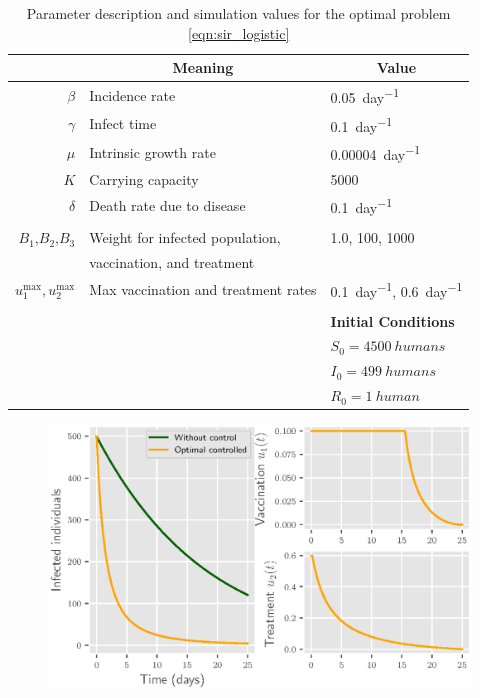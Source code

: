 \begin{table}[htb]
  \begin{center}
    \begin{tabular}{@{}rll@{}} 
      \toprule
      &
      \multicolumn{1}{c}{\textbf{Meaning}}
      & 
      \multicolumn{1}{c}{\textbf{Value}}
      \\
        \midrule
        $\beta$
          & Incidence rate
          & \SI{0.05}{day^{-1}}
      \\
      $\gamma$
        & Infect time
        & \SI{0.1}{day^{-1}}
      \\
      $\mu$
        & Intrinsic growth rate
        & \SI{0.00004}{day^{-1}}
      \\
        $K$
        & Carrying capacity
        & \num{5000}
      \\
      $\delta$
        & Death rate due to disease
        & \SI{0.1}{day^{-1}}
      \\
      \\  
      $B_1$,$B_2$,$B_3$
        & Weight for infected population,
        & \num{1.0}, \num{100}, \num{1000}
        \\
        & vaccination, and treatment 
      \\
      $u_1^{\max}, u_2^{\max}$
        & Max vaccination and treatment rates
        & \SI{0.1}{day^{-1}}, \SI{0.6}{day^{-1}}
      \\
      \\
      && \textbf{Initial Conditions}
      \\
      \cmidrule{3-3}
      && $S_0 = \SI{4500}{humans}$
      \\
      && $I_0 = \SI{499}{humans}$
      \\
      && $R_0 = \SI{1}{human}$
      \\
      \bottomrule
    \end{tabular}
    \caption{Parameter description and simulation values for the optimal problem
      \eqref{eqn:sir_logistic}
    }
    \label{tbl:sir_logistic}
	\end{center}
\end{table}
%
\begin{figure}
  \centering
  \includegraphics{Figures/figure_1_sir_log}
  \caption{}
  \label{fig:figure1sirlog}
\end{figure}


